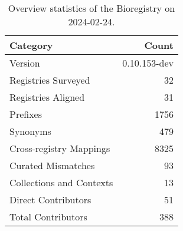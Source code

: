 \begin{table}
\caption{Overview statistics of the Bioregistry on 2024-02-24.}
\label{tab:bioregistry-summary}
\begin{tabular}{lr}
\toprule
Category & Count \\
\midrule
Version & 0.10.153-dev \\
Registries Surveyed & 32 \\
Registries Aligned & 31 \\
Prefixes & 1756 \\
Synonyms & 479 \\
Cross-registry Mappings & 8325 \\
Curated Mismatches & 93 \\
Collections and Contexts & 13 \\
Direct Contributors & 51 \\
Total Contributors & 388 \\
\bottomrule
\end{tabular}
\end{table}
